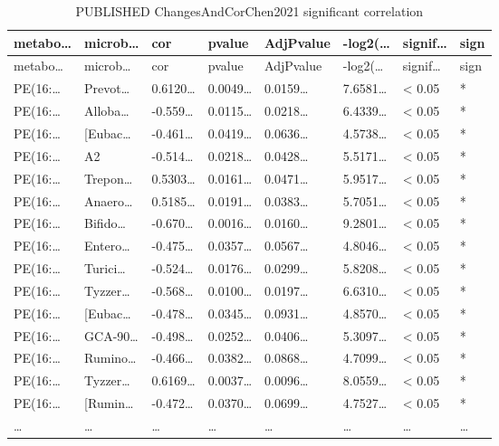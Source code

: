 \documentclass[
]{article}
\begin{document}
\begin{longtable}[]{@{}llllllll@{}}
\caption{\label{tab:PUBLISHED-ChangesAndCorChen2021-significant-correlation}PUBLISHED ChangesAndCorChen2021 significant correlation}\tabularnewline
\toprule
metabo\ldots{} & microb\ldots{} & cor & pvalue & AdjPvalue & -log2(\ldots{} & signif\ldots{} & sign\tabularnewline
\midrule
\endfirsthead
\toprule
metabo\ldots{} & microb\ldots{} & cor & pvalue & AdjPvalue & -log2(\ldots{} & signif\ldots{} & sign\tabularnewline
\midrule
\endhead
PE(16:\ldots{} & Prevot\ldots{} & 0.6120\ldots{} & 0.0049\ldots{} & 0.0159\ldots{} & 7.6581\ldots{} & \textless{} 0.05 & *\tabularnewline
PE(16:\ldots{} & Alloba\ldots{} & -0.559\ldots{} & 0.0115\ldots{} & 0.0218\ldots{} & 6.4339\ldots{} & \textless{} 0.05 & *\tabularnewline
PE(16:\ldots{} & {[}Eubac\ldots{} & -0.461\ldots{} & 0.0419\ldots{} & 0.0636\ldots{} & 4.5738\ldots{} & \textless{} 0.05 & *\tabularnewline
PE(16:\ldots{} & A2 & -0.514\ldots{} & 0.0218\ldots{} & 0.0428\ldots{} & 5.5171\ldots{} & \textless{} 0.05 & *\tabularnewline
PE(16:\ldots{} & Trepon\ldots{} & 0.5303\ldots{} & 0.0161\ldots{} & 0.0471\ldots{} & 5.9517\ldots{} & \textless{} 0.05 & *\tabularnewline
PE(16:\ldots{} & Anaero\ldots{} & 0.5185\ldots{} & 0.0191\ldots{} & 0.0383\ldots{} & 5.7051\ldots{} & \textless{} 0.05 & *\tabularnewline
PE(16:\ldots{} & Bifido\ldots{} & -0.670\ldots{} & 0.0016\ldots{} & 0.0160\ldots{} & 9.2801\ldots{} & \textless{} 0.05 & *\tabularnewline
PE(16:\ldots{} & Entero\ldots{} & -0.475\ldots{} & 0.0357\ldots{} & 0.0567\ldots{} & 4.8046\ldots{} & \textless{} 0.05 & *\tabularnewline
PE(16:\ldots{} & Turici\ldots{} & -0.524\ldots{} & 0.0176\ldots{} & 0.0299\ldots{} & 5.8208\ldots{} & \textless{} 0.05 & *\tabularnewline
PE(16:\ldots{} & Tyzzer\ldots{} & -0.568\ldots{} & 0.0100\ldots{} & 0.0197\ldots{} & 6.6310\ldots{} & \textless{} 0.05 & *\tabularnewline
PE(16:\ldots{} & {[}Eubac\ldots{} & -0.478\ldots{} & 0.0345\ldots{} & 0.0931\ldots{} & 4.8570\ldots{} & \textless{} 0.05 & *\tabularnewline
PE(16:\ldots{} & GCA-90\ldots{} & -0.498\ldots{} & 0.0252\ldots{} & 0.0406\ldots{} & 5.3097\ldots{} & \textless{} 0.05 & *\tabularnewline
PE(16:\ldots{} & Rumino\ldots{} & -0.466\ldots{} & 0.0382\ldots{} & 0.0868\ldots{} & 4.7099\ldots{} & \textless{} 0.05 & *\tabularnewline
PE(16:\ldots{} & Tyzzer\ldots{} & 0.6169\ldots{} & 0.0037\ldots{} & 0.0096\ldots{} & 8.0559\ldots{} & \textless{} 0.05 & *\tabularnewline
PE(16:\ldots{} & {[}Rumin\ldots{} & -0.472\ldots{} & 0.0370\ldots{} & 0.0699\ldots{} & 4.7527\ldots{} & \textless{} 0.05 & *\tabularnewline
\ldots{} & \ldots{} & \ldots{} & \ldots{} & \ldots{} & \ldots{} & \ldots{} & \ldots{}\tabularnewline
\bottomrule
\end{longtable}
\end{document}
